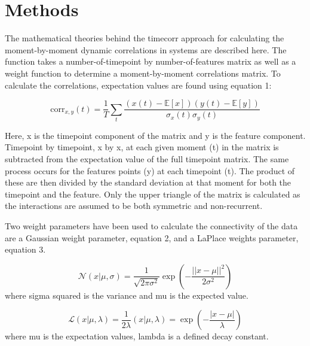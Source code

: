 \section*{Methods}

The mathematical theories behind the timecorr approach for calculating the moment-by-moment dynamic correlations in systems are described here. The function takes a number-of-timepoint by number-of-features matrix as well as a weight function to determine a moment-by-moment correlations matrix. To calculate the correlations, expectation values are found using equation 1: 

\begin{equation}
\mathrm{corr}_{x,y}(t) = \frac{1}{T} \sum_{t} \frac{\left(x(t)-\mathbb{E}[x]\right)\left(y(t)-\mathbb{E}[y]\right)}{\sigma_{x}(t)\sigma_{y}(t)}
\end{equation}

Here, x is the timepoint component of the matrix and y is the feature component. Timepoint by timepoint, x by x, at each given moment (t) in the matrix is subtracted from the expectation value of the full timepoint matrix. The same process occurs for the features points (y) at each timepoint (t). The product of these are then divided by the standard deviation at that moment for both the timepoint and the feature. Only the upper triangle of the matrix is calculated as the interactions are assumed to be both symmetric and non-recurrent. 

Two weight parameters have been used to calculate the connectivity of the data are a Gaussian weight parameter, equation 2, and a LaPlace weights parameter, equation 3. 

\begin{equation}
\mathcal{N}\left( x | \mu, \sigma \right) = \frac{1}{\sqrt{2\pi\sigma^2}}\exp\left(-\frac{|| x - \mu ||^2}{2\sigma^2}\right)
\end{equation}
where sigma squared is the variance and mu is the expected value. 

\begin{equation}
\mathcal{L}\left( x | \mu, \lambda \right) = \frac{1}{2 \lambda}\left( x | \mu, \lambda \right) = \exp\left(-\frac{|x - \mu|}{\lambda}\right)
\end{equation}
where mu is the expectation values, lambda is a defined decay constant. 

